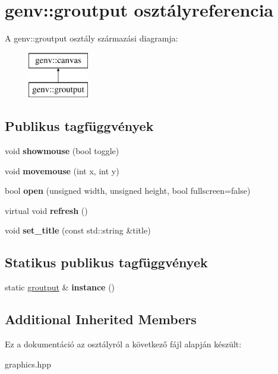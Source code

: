 \hypertarget{classgenv_1_1groutput}{}\section{genv\+:\+:groutput osztályreferencia}
\label{classgenv_1_1groutput}
A genv\+:\+:groutput osztály származási diagramja\+:\begin{figure}[H]
\begin{center}
\leavevmode
\includegraphics[height=2.000000cm]{classgenv_1_1groutput}
\end{center}
\end{figure}
\subsection*{Publikus tagfüggvények}
\begin{DoxyCompactItemize}
\item 
\mbox{\label{classgenv_1_1groutput_a8ed996705e1dc0620715b193c971faf8}} 
void {\bfseries showmouse} (bool toggle)
\item 
\mbox{\label{classgenv_1_1groutput_a2d0714199248562a8b0c8124dec148ea}} 
void {\bfseries movemouse} (int x, int y)
\item 
\mbox{\label{classgenv_1_1groutput_a4f2e395396c08492e5fb23e63d9d3c77}} 
bool {\bfseries open} (unsigned width, unsigned height, bool fullscreen=false)
\item 
\mbox{\label{classgenv_1_1groutput_a5cf426dcd4d104ad23e359e4d8106ad3}} 
virtual void {\bfseries refresh} ()
\item 
\mbox{\label{classgenv_1_1groutput_acb0e52cee139f03f653a8adefc7c31ba}} 
void {\bfseries set\+\_\+title} (const std\+::string \&title)
\end{DoxyCompactItemize}
\subsection*{Statikus publikus tagfüggvények}
\begin{DoxyCompactItemize}
\item 
\mbox{\label{classgenv_1_1groutput_aaa2dd41fe95e14d04e97c4811dcacf75}} 
static \hyperlink{classgenv_1_1groutput}{groutput} \& {\bfseries instance} ()
\end{DoxyCompactItemize}
\subsection*{Additional Inherited Members}


Ez a dokumentáció az osztályról a következő fájl alapján készült\+:\begin{DoxyCompactItemize}
\item 
graphics.\+hpp\end{DoxyCompactItemize}

